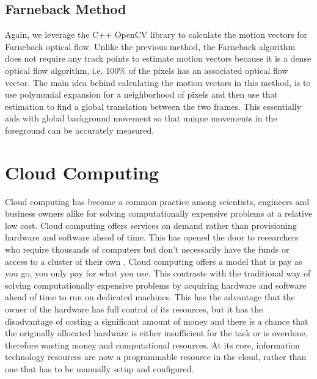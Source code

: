 \subsection{\label{subsection:farneback_method}Farneback Method} Again, we
leverage the C++ OpenCV library to calculate the motion vectors for Farneback
optical flow. Unlike the previous method, the Farneback algorithm does not
require any track points to estimate motion vectors because it is a dense
optical flow algorithm, i.e. 100\% of the pixels has an associated optical flow
vector. The main idea behind calculating the motion vectors in this method, is
to use polynomial expansion for a neighborhood of pixels \cite{farneback2003two}
and then use that estimation to find a global translation between the two
frames. This essentially aids with global background movement so that unique
movements in the foreground can be accurately measured.

\section{\label{section:cloud_computing}Cloud Computing}
Cloud computing has become a common practice among scientists, engineers and
business owners alike for solving computationally expensive problems at a
relative low cost. Cloud computing offers services on demand rather than
provisioning hardware and software ahead of time. This has opened the door to
researchers who require thousands of computers but don't necessarily have the
funds or access to a cluster of their own \cite{armbrust2009above}. Cloud
computing offers a model that is pay as you go, you only pay for what you use.
This contrasts with the traditional way of solving computationally expensive
problems by acquiring hardware and software ahead of time to run on dedicated
machines. This has the advantage that the owner of the hardware has full control
of its resources, but it has the disadvantage of costing a significant amount of
money and there is a chance that the originally allocated hardware is  either
insufficient for the task or is overdone,  therefore wasting money and
computational resources.  At its core, information technology resources are now
a programmable resource in the cloud, rather than one that has to be manually
setup and configured.

